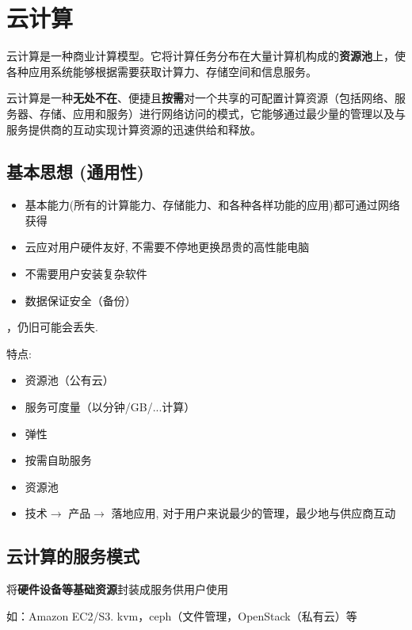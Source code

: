 \section{云计算}

\begin{definition}[云计算]
    云计算是一种商业计算模型。它将计算任务分布在大量计算机构成的\textbf{资源池}上，使各种应用系统能够根据需要获取计算力、存储空间和信息服务。

    云计算是一种\textbf{无处不在}、便捷且\textbf{按需}对一个共享的可配置计算资源（包括网络、服务器、存储、应用和服务）进行网络访问的模式，它能够通过最少量的管理以及与服务提供商的互动实现计算资源的迅速供给和释放。
\end{definition}

\subsection{基本思想 (通用性)}

\begin{itemize}
    \item 基本能力(所有的计算能力、存储能力、和各种各样功能的应用)都可通过网络获得
    \item 云应对用户硬件友好, 不需要不停地更换昂贵的高性能电脑
    \item 不需要用户安装复杂软件
    \item 数据保证安全（备份）
\end{itemize}

，仍旧可能会丢失.

特点:
\begin{itemize}
    \item 资源池（公有云）
    \item 服务可度量（以分钟/GB/...计算）
    \item 弹性
    \item 按需自助服务
    \item 资源池
    \item 技术$\rightarrow$ 产品$\rightarrow$ 落地应用, 对于用户来说最少的管理，最少地与供应商互动
\end{itemize}

\subsection{云计算的服务模式}

\begin{definition}
    将\textbf{硬件设备等基础资源}封装成服务供用户使用

    如：Amazon EC2/S3. kvm，ceph（文件管理，OpenStack（私有云）等
\end{definition}


